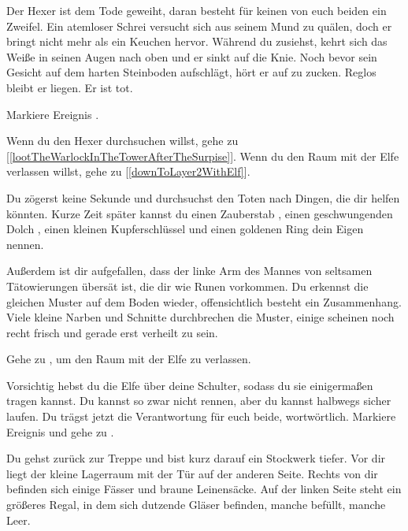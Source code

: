 Der Hexer ist dem Tode geweiht, daran besteht für keinen von euch beiden ein Zweifel. Ein atemloser Schrei versucht sich aus seinem Mund zu quälen, doch er bringt nicht mehr als ein Keuchen hervor. Während du zusiehst, kehrt sich das Weiße in seinen Augen nach oben und er sinkt auf die Knie. Noch bevor sein Gesicht auf dem harten Steinboden aufschlägt, hört er auf zu zucken. Reglos bleibt er liegen. Er ist tot.

Markiere Ereignis .

Wenn du den Hexer durchsuchen willst, gehe zu [\ref{lootTheWarlockInTheTowerAfterTheSurpise}].
Wenn du den Raum mit der Elfe verlassen willst, gehe zu [\ref{downToLayer2WithElf}].


Du zögerst keine Sekunde und durchsuchst den Toten nach Dingen, die dir helfen könnten.
Kurze Zeit später kannst du einen Zauberstab , einen geschwungenden Dolch , einen kleinen Kupferschlüssel  und einen goldenen Ring  dein Eigen nennen.

Außerdem ist dir aufgefallen, dass der linke Arm des Mannes von seltsamen Tätowierungen übersät ist, die dir wie Runen vorkommen. Du erkennst die gleichen Muster auf dem Boden wieder, offensichtlich besteht ein Zusammenhang. Viele kleine Narben und Schnitte durchbrechen die Muster, einige scheinen noch recht frisch und gerade erst verheilt zu sein.

Gehe zu , um den Raum mit der Elfe zu verlassen.


Vorsichtig hebst du die Elfe über deine Schulter, sodass du sie einigermaßen tragen kannst. Du kannst so zwar nicht rennen, aber du kannst halbwegs sicher laufen. Du trägst jetzt die Verantwortung für euch beide, wortwörtlich. Markiere Ereignis  und gehe zu .


Du gehst zurück zur Treppe und bist kurz darauf ein Stockwerk tiefer. Vor dir liegt der kleine Lagerraum mit der Tür auf der anderen Seite. Rechts von dir befinden sich einige Fässer und braune Leinensäcke. Auf der linken Seite steht ein größeres Regal, in dem sich dutzende Gläser befinden, manche befüllt, manche Leer.

